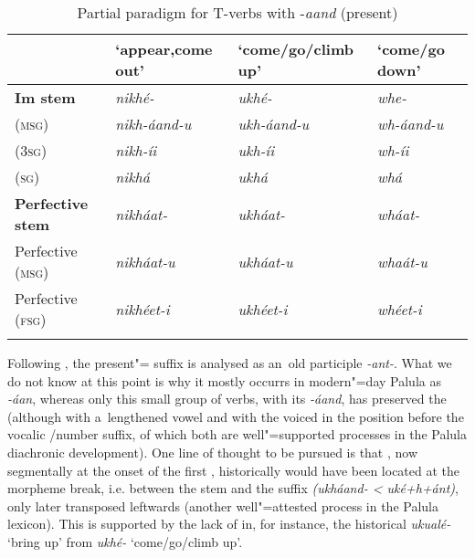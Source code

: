 \begin{table}[h]
\caption{Partial paradigm for T-verbs with -\textit{aand} (present)}
\begin{tabularx}{\textwidth}{ l Q Q Q }
\lsptoprule
&
`appear,\newline come out' &
`come/go/\newline climb up' &
`come/go down'\\\midrule
\textbf{Im stem} &
\textit{nikhé- } &
\textit{ukhé-} &
\textit{whe-} \\
 (\textsc{msg}) &
\textit{nikh-áand-u} &
\textit{ukh-áand-u} &
\textit{wh-áand-u} \\
 (\textsc{3sg}) &
\textit{nikh-íi} &
\textit{ukh-íi} &
\textit{wh-íi} \\
 (\textsc{sg}) &
\textit{nikhá} &
\textit{ukhá} &
\textit{whá} \\
\textbf{Perfective stem} &
\textit{nikháat-} &
\textit{ukháat-} &
\textit{wháat-} \\
Perfective (\textsc{msg}) &
\textit{nikháat-u} &
\textit{ukháat-u} &
\textit{whaát-u} \\
Perfective (\textsc{fsg}) &
\textit{nikhéet-i} &
\textit{ukhéet-i} &
\textit{whéet-i} \\\lspbottomrule
\end{tabularx}
\label{tab:8-10}
\end{table}


Following \citet[22]{morgenstierne1941}, the present"= suffix is analysed as an~old participle \textit{-ant-}. What we do not know at this point is why it mostly occurrs in modern"=day Palula as \textit{-áan}, whereas only this small group of verbs, with its \textit{-áand}, has preserved the  (although with a~lengthened vowel and with the  voiced in the position before the vocalic /number suffix, of which both are well"=supported processes in the Palula diachronic development). One line of thought to be pursued is that , now segmentally at the onset of the first , historically would have been located at the morpheme break, i.e. between the stem and the  suffix \textit{(ukháand- {\textless} uké+h+ánt)}, only later transposed leftwards (another well"=attested process in the Palula lexicon). This is supported by the lack of  in, for instance, the historical  \textit{ukualé-} `bring up' from \textit{ukhé-} `come/go/climb up'.


